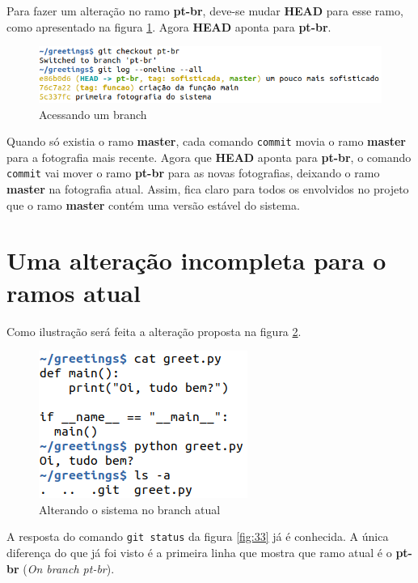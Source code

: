 \documentclass[a4paper]{book}
\begin{document}
Para fazer um alteração no ramo \textbf{pt-br}, deve-se mudar 
\textbf{HEAD} para esse ramo, como apresentado na figura
\ref{fig:31}. Agora \textbf{HEAD} aponta para \textbf{pt-br}.

\begin{figure}[ht]
\caption{Acessando um branch}
\label{fig:31}
\centering
\includegraphics[scale=0.6,left]{"images/31-Acessando um branch.png"}
\end{figure}

Quando só existia o ramo \textbf{master}, cada comando
\texttt{commit} movia o ramo \textbf{master} para a
fotografia mais recente.
Agora que \textbf{HEAD} aponta para \textbf{pt-br},
o comando \texttt{commit} vai mover o ramo \textbf{pt-br}
para as novas fotografias, deixando o ramo
\textbf{master} na fotografia atual.
Assim, fica claro para todos os envolvidos no projeto
que o ramo \textbf{master} contém uma versão estável
do sistema.

\section{Uma alteração incompleta para o ramos atual}

Como ilustração será feita a alteração proposta na
figura \ref{fig:32}.

\begin{figure}[ht]
\caption{Alterando o sistema no branch atual}
\label{fig:32}
\centering
\includegraphics[scale=0.6,left]{"images/32-Alterando o sistema no branch atual.png"}
\end{figure}

A resposta do comando \texttt{git status} da figura
\ref{fig:33} já é conhecida. 
A única diferença do que já foi visto é a primeira linha
que mostra que ramo atual é o \textbf{pt-br} 
(\textit{On branch pt-br}).
\end{document}
